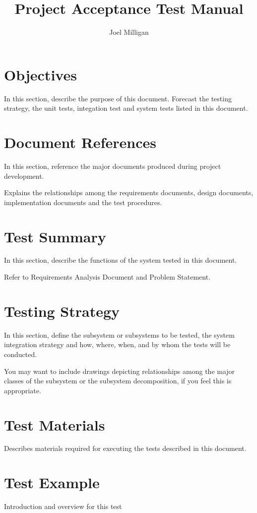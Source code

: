 \documentclass[a4paper, draft]{article}
\author{Joel Milligan}
\title{Project Acceptance Test Manual}
\date{}
\begin{document}
\maketitle
\tableofcontents

\newpage
\section{Objectives}
In this section, describe the purpose of this document.
Forecast the testing strategy, the unit tests, integation test and system tests listed in this document.

\section{Document References}
In this section, reference the major documents produced during project development.

Explains the relationships among the requirements documents, design documents, implementation documents and the test procedures.

\section{Test Summary}
In this section, describe the functions of the system tested in this document.

Refer to Requirements Analysis Document and Problem Statement.

\section{Testing Strategy}
In this section, define the subsystem or subsystems to be tested, the system integration strategy and how, where, when, and by whom the tests will be conducted.

You may want to include drawings depicting relationships among the major classes of the subsystem or the subsystem decomposition, if you feel this is appropriate.

\section{Test Materials}
Describes materials required for executing the tests described in this document.

\newpage
\section{Test Example}
Introduction and overview for this test
\end{document}
